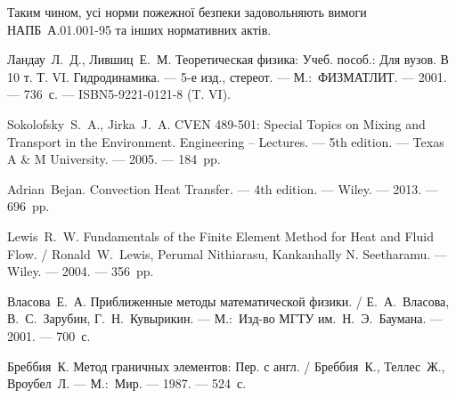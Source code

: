 \documentclass{diploma}
\begin{document}
Таким чином, усі норми пожежної безпеки задовольняють вимоги НАПБ~А.01.001-95 та інших нормативних актів.

\conclusion


\begin{thebibliography}
Ландау~Л.~Д., Лившиц~Е.~М. Теоретическая физика: Учеб. пособ.: Для вузов. В 10 т. Т. VI. Гидродинамика. --- 5-е изд., стереот. --- М.:~ФИЗМАТЛИТ. --- 2001. --- 736~с. --- ISBN5-9221-0121-8 (T. VI).

Sokolofsky~S.~A., Jirka~J.~A. CVEN 489-501: Special Topics on Mixing and Transport in the Environment. Engineering -- Lectures. --- 5th edition. --- Texas A \& M University. --- 2005. --- 184~pp.

Adrian~Bejan. Convection Heat Transfer. --- 4th edition. --- Wiley. --- 2013. --- 696~pp.

Lewis~R.~W. Fundamentals of the Finite Element Method for Heat and Fluid Flow. / Ronald~W.~Lewis, Perumal Nithiarasu, Kankanhally N. Seetharamu. --- Wiley. --- 2004. --- 356~pp.

Власова~Е.~А. Приближенные методы математической физики. / Е.~А.~Власова, В.~С.~Зарубин, Г.~Н.~Кувырикин. --- М.:~Изд-во МГТУ им.~Н.~Э.~Баумана. --- 2001. --- 700~с.

Бреббия~К. Метод граничных элементов: Пер. с англ. / Бреббия~К., Теллес~Ж., Вроубел~Л. --- М.:~Мир. --- 1987. --- 524~с.

\end{thebibliography}



\end{document}
